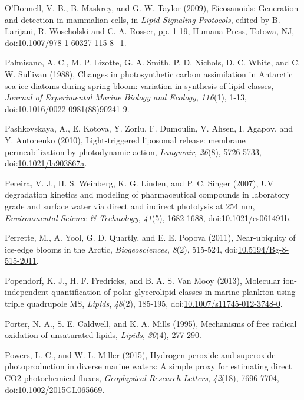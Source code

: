 \begin{singlespace}
{{O'Donnell, V. B., B. Maskrey, and G. W. Taylor (2009), Eicosanoids: Generation and detection in mammalian cells, in \emph{Lipid Signaling Protocols}, edited by B. Larijani, R. Woscholski and C. A. Rosser, pp. 1-19, Humana Press, Totowa, NJ, doi:\href{http://dx.doi.org/10.1007/978-1-60327-115-8_1}{10.1007/978-1-60327-115-8\_1}.

Palmisano, A. C., M. P. Lizotte, G. A. Smith, P. D. Nichols, D. C. White, and C. W. Sullivan (1988), Changes in photosynthetic carbon assimilation in Antarctic sea-ice diatoms during spring bloom: variation in synthesis of lipid classes, \emph{Journal of Experimental Marine Biology and Ecology}, \emph{116}(1), 1-13, doi:\href{http://dx.doi.org/10.1016/0022-0981(88)90241-9}{10.1016/0022-0981(88)90241-9}.

Pashkovskaya, A., E. Kotova, Y. Zorlu, F. Dumoulin, V. Ahsen, I. Agapov, and Y. Antonenko (2010), Light-triggered liposomal release: membrane permeabilization by photodynamic action, \emph{Langmuir}, \emph{26}(8), 5726-5733, doi:\href{http://dx.doi.org/10.1021/la903867a}{10.1021/la903867a}.

Pereira, V. J., H. S. Weinberg, K. G. Linden, and P. C. Singer (2007), UV degradation kinetics and modeling of pharmaceutical compounds in laboratory grade and surface water via direct and indirect photolysis at 254 nm, \emph{Environmental Science \& Technology}, \emph{41}(5), 1682-1688, doi:\href{http://dx.doi.org/10.1021/es061491b}{10.1021/es061491b}.

Perrette, M., A. Yool, G. D. Quartly, and E. E. Popova (2011), Near-ubiquity of ice-edge blooms in the Arctic, \emph{Biogeosciences}, \emph{8}(2), 515-524, doi:\href{http://dx.doi.org/10.5194/Bg-8-515-2011}{10.5194/Bg-8-515-2011}.

Popendorf, K. J., H. F. Fredricks, and B. A. S. Van Mooy (2013), Molecular ion-independent quantification of polar glycerolipid classes in marine plankton using triple quadrupole MS, \emph{Lipids}, \emph{48}(2), 185-195, doi:\href{http://dx.doi.org/10.1007/s11745-012-3748-0}{10.1007/s11745-012-3748-0}.

Porter, N. A., S. E. Caldwell, and K. A. Mills (1995), Mechanisms of free radical oxidation of unsaturated lipids, \emph{Lipids}, \emph{30}(4), 277-290.

Powers, L. C., and W. L. Miller (2015), Hydrogen peroxide and superoxide photoproduction in diverse marine waters: A simple proxy for estimating direct CO2 photochemical fluxes, \emph{Geophysical Research Letters}, \emph{42}(18), 7696-7704, doi:\href{http://dx.doi.org/10.1002/2015GL065669}{10.1002/2015GL065669}.

}}
\end{singlespace}
